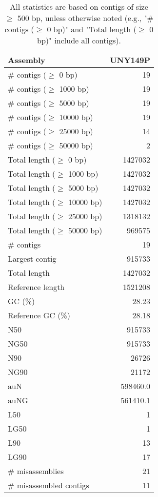 \documentclass[12pt,a4paper]{article}
\begin{document}
\begin{table}[ht]
\begin{center}
\caption{All statistics are based on contigs of size $\geq$ 500 bp, unless otherwise noted (e.g., "\# contigs ($\geq$ 0 bp)" and "Total length ($\geq$ 0 bp)" include all contigs).}
\begin{tabular}{|l*{1}{|r}|}
\hline
Assembly & UNY149P \\ \hline
\# contigs ($\geq$ 0 bp) & 19 \\ \hline
\# contigs ($\geq$ 1000 bp) & 19 \\ \hline
\# contigs ($\geq$ 5000 bp) & 19 \\ \hline
\# contigs ($\geq$ 10000 bp) & 19 \\ \hline
\# contigs ($\geq$ 25000 bp) & 14 \\ \hline
\# contigs ($\geq$ 50000 bp) & 2 \\ \hline
Total length ($\geq$ 0 bp) & 1427032 \\ \hline
Total length ($\geq$ 1000 bp) & 1427032 \\ \hline
Total length ($\geq$ 5000 bp) & 1427032 \\ \hline
Total length ($\geq$ 10000 bp) & 1427032 \\ \hline
Total length ($\geq$ 25000 bp) & 1318132 \\ \hline
Total length ($\geq$ 50000 bp) & 969575 \\ \hline
\# contigs & 19 \\ \hline
Largest contig & 915733 \\ \hline
Total length & 1427032 \\ \hline
Reference length & 1521208 \\ \hline
GC (\%) & 28.23 \\ \hline
Reference GC (\%) & 28.18 \\ \hline
N50 & 915733 \\ \hline
NG50 & 915733 \\ \hline
N90 & 26726 \\ \hline
NG90 & 21172 \\ \hline
auN & 598460.0 \\ \hline
auNG & 561410.1 \\ \hline
L50 & 1 \\ \hline
LG50 & 1 \\ \hline
L90 & 13 \\ \hline
LG90 & 17 \\ \hline
\# misassemblies & 21 \\ \hline
\# misassembled contigs & 11 \\ \hline

\end{tabular}
\end{center}
\end{table}
\end{document}
